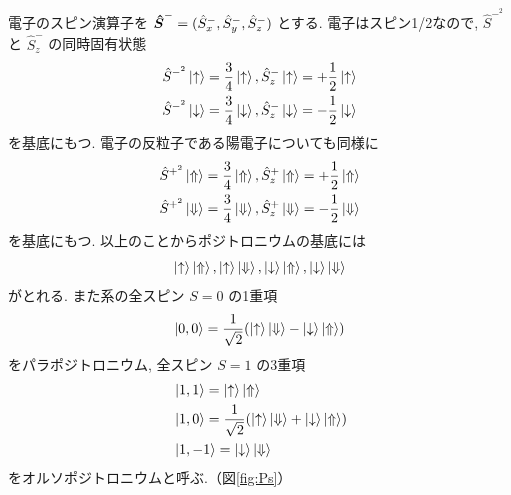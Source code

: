 電子のスピン演算子を
$\mbox{\boldmath $\hat{S}$}^{-} = (\hat{S}^{-}_{x},\hat{S}^{-}_{y},\hat{S}^{-}_{z})$
とする.
電子はスピン1/2なので,
$\hat{S}^{-^{2}}$
と
$\hat{S}^{-}_{z}$
の同時固有状態
\begin{equation}
\begin{split}
\hat{S}^{-^{2}} \ket{ \uparrow } = \frac{3}{4} \ket{ \uparrow },
\hat{S}^{-}_{z} \ket{ \uparrow } = + \frac{1}{2} \ket{ \uparrow } \\
\hat{S}^{-^{2}} \ket{ \downarrow } = \frac{3}{4} \ket{ \downarrow },
\hat{S}^{-}_{z} \ket{ \downarrow } = - \frac{1}{2} \ket{ \downarrow }
\end{split}
\label{eq:groundele}
\end{equation}
を基底にもつ.
電子の反粒子である陽電子についても同様に
\begin{equation}
\begin{split}
\hat{S}^{+^{2}} \ket{ \Uparrow } = \frac{3}{4} \ket{ \Uparrow },
\hat{S}^{+}_{z} \ket{ \Uparrow } = + \frac{1}{2} \ket{ \Uparrow } \\
\hat{S}^{+^{2}} \ket{ \Downarrow } = \frac{3}{4} \ket{ \Downarrow },
\hat{S}^{+}_{z} \ket{ \Downarrow } = - \frac{1}{2} \ket{ \Downarrow }
\end{split}
\label{eq:groundeposi}
\end{equation}
を基底にもつ.
以上のことからポジトロニウムの基底には
\begin{equation}
	\nonumber
\ket{ \uparrow } \ket{ \Uparrow },\ket{ \uparrow } \ket{ \Downarrow },
\ket{ \downarrow } \ket{ \Uparrow },\ket{ \downarrow } \ket{ \Downarrow }
\end{equation}
がとれる.
また系の全スピン $S = 0$ の1重項
\begin{equation}
\ket{0,0} = \frac{1}{\sqrt{2}} ( \ket{ \uparrow } \ket{ \Downarrow } - \ket{ \downarrow } \ket{ \Uparrow })
\label{eq:para}
\end{equation}
をパラポジトロニウム,
全スピン $S = 1$ の3重項
\begin{equation}
\begin{split}
&\ket{1,1} = \ket{ \uparrow } \ket{ \Uparrow } \\
&\ket{1,0} = \frac{1}{\sqrt{2}} ( \ket{ \uparrow } \ket{ \Downarrow } + \ket{ \downarrow } \ket{ \Uparrow }) \\
&\ket{1,-1} = \ket{ \downarrow } \ket{ \Downarrow }
\end{split}
\label{eq:ortho}
\end{equation}
をオルソポジトロニウムと呼ぶ.（図\ref{fig:Ps}）

